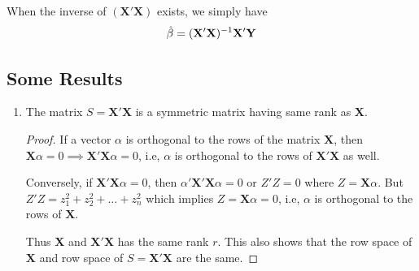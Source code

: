 \documentclass[10pt, a4paper]{article}
\begin{document}
When the inverse of \( (\mathbf{X}'\mathbf{X}) \) exists, we simply have
\begin{equation}
	\hat{\beta} = (\mathbf{X}'\mathbf{X})^{-1}\mathbf{X}'\mathbf{Y}
\end{equation}

\subsection{Some Results}

\begin{enumerate}[1.]
	\item The matrix \( S = \mathbf{X}'\mathbf{X} \) is a symmetric matrix having same rank as \( \mathbf{X} \).
\begin{proof}
If a vector \( \alpha \) is orthogonal to the rows of the matrix \( \mathbf{X} \), then \( \mathbf{X} \alpha = 0 \implies \mathbf{X}'\mathbf{X} \alpha = 0 \), i.e, \( \alpha \) is orthogonal to the rows of \( \mathbf{X}'\mathbf{X} \) as well.

Conversely, if \( \mathbf{X}'\mathbf{X} \alpha = 0 \), then \( \alpha'\mathbf{X}'\mathbf{X}\alpha = 0\) or \( Z'Z = 0 \) where \( Z = \mathbf{X}\alpha \). But \( Z'Z = z_{1}^{2} + z_{2}^{2} + \dots + z_{n}^{2} \) which implies \( Z = \mathbf{X}\alpha = 0 \), i.e, \( \alpha \) is orthogonal to the rows of \( \mathbf{X} \).

Thus \( \mathbf{X} \) and \( \mathbf{X}'\mathbf{X} \) has the same rank \( r \). This also shows that the row space of \( \mathbf{X} \) and row space of \( S = \mathbf{X}'\mathbf{X} \) are the same.
\end{proof}


\end{enumerate}
\end{document}
